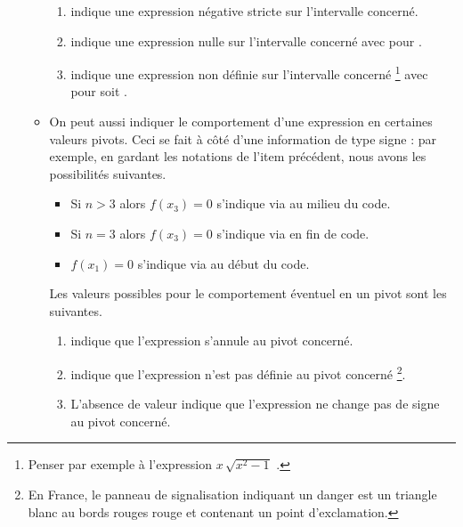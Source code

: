 \documentclass[12pt, a4paper]{article}
\begin{document}
\begin{enumerate}
\begin{itemize}
\begin{enumerate}
            \item \tdocinlatex{-} indique une expression négative stricte sur l'intervalle concerné.

            \item {} indique une expression nulle sur l'intervalle concerné avec  pour .

            \item {} indique une expression non définie sur l'intervalle concerné
            \footnote{
                Penser par exemple à l'expression $x \, \sqrt{x^2 - 1}$ .
            }
            avec  pour  soit .
        \end{enumerate}


        \item On peut aussi indiquer le comportement d'une expression en certaines valeurs pivots. Ceci se fait à côté d'une information de type signe : par exemple, en gardant les notations de l'item précédent, nous avons les possibilités suivantes.
        \begin{itemize}
            \item Si $n > 3$ alors $f(x_3) = 0$ s'indique via  au milieu du code.

            \item Si $n = 3$ alors $f(x_3) = 0$ s'indique via  en fin de code.

            \item $f(x_1) = 0$ s'indique via     au début du code.
        \end{itemize}
        Les valeurs possibles pour le comportement éventuel en un pivot sont les suivantes.
        \begin{enumerate}
            \item {} indique que
l'expression s'annule au pivot concerné.

            \item \tdocinlatex{!} indique que
l'expression n'est pas définie au pivot concerné
            \footnote{
                En France, le panneau de signalisation indiquant un danger est un triangle blanc au bords rouges rouge et contenant un point d'exclamation.
            }.

            \item L'absence de valeur indique que l'expression ne change pas de signe au pivot concerné.
        \end{enumerate}
    \end{itemize}
\end{enumerate}
\end{document}
